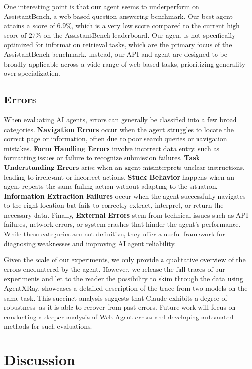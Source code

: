 \documentclass[10pt]{article} %
\begin{document}
One interesting point is that our agent seems to underperform on AssistantBench, a web-based question-answering benchmark. Our best agent attains a score of $6.9\%$, which is a very low score compared to the current high score of $27\%$ on the AssistantBench leaderboard.
Our agent is not specifically optimized for information retrieval tasks, which are the primary focus of the AssistantBench benchmark. Instead, our API and agent are designed to be broadly applicable across a wide range of web-based tasks, prioritizing generality over specialization.

\subsection{Errors}
When evaluating AI agents, errors can generally be classified into a few broad categories. \textbf{Navigation Errors} occur when the agent struggles to locate the correct page or information, often due to poor search queries or navigation mistakes. \textbf{Form Handling Errors} involve incorrect data entry, such as formatting issues or failure to recognize submission failures. \textbf{Task Understanding Errors} arise when an agent misinterprets unclear instructions, leading to irrelevant or incorrect actions. \textbf{Stuck Behavior} happens when an agent repeats the same failing action without adapting to the situation. \textbf{Information Extraction Failures} occur when the agent successfully navigates to the right location but fails to correctly extract, interpret, or return the necessary data. Finally, \textbf{External Errors} stem from technical issues such as API failures, network errors, or system crashes that hinder the agent’s performance. While these categories are not definitive, they offer a useful framework for diagnosing weaknesses and improving AI agent reliability.

Given the scale of our experiments, we only provide a qualitative overview of the errors encountered by the agent. However, we release the full traces of our experiments and let to the reader the possibility to skim through the data using AgentXRay.  showcases a detailed description of the trace from two models on the same task. This succinct analysis suggests that Claude exhibits a degree of robustness, as it is able to recover from past errors. Future work will focus on conducting a deeper analysis of Web Agent errors and developing automated methods for such evaluations.

\section{Discussion}
\end{document}
